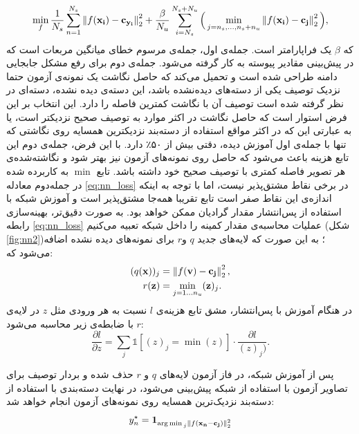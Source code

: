 \begin{equation}
\label{eq:nn_loss}
\min_{f}
\frac{1}{N_s} \sum_{n=1}^{N_s} \left \lVert f(\mathbf{x_i}) - \mathbf{c_{y_i}} \right \rVert_2^2 +
\frac{\beta}{N_u} \sum_{i=N_s}^{N_s+N_u} \Big ( \min_{j=n_s,\ldots,n_s + n_u} \left \lVert f(\mathbf{x_i) - c_j} \right \rVert_2^2 \Big ),
\end{equation}
که $\beta$ یک فراپارامتر است.
جمله‌ی اول، جمله‌ی مرسوم خطای میانگین مربعات است که در پیش‌بینی مقادیر پیوسته به کار گرفته می‌شود. جمله‌ی دوم برای رفع مشکل جابجایی دامنه طراحی شده است و تحمیل می‌کند که حاصل نگاشت یک نمونه‌ی آزمون حتما نزدیک توصیف یکی از دسته‌های دیده‌نشده باشد، این دسته‌ی دیده نشده، دسته‌ای در نظر گرفته شده است توصیف آن با نگاشت کمترین فاصله را دارد. این انتخاب بر این فرض استوار است که حاصل نگاشت در اکثر موارد به توصیف صحیح نزدیکتر است، یا به عبارتی این که در اکثر مواقع استفاده از دسته‌بند نزدیکترین همسایه روی نگاشتی که تنها با جمله‌ی اول آموزش دیده، دقتی بیش از ۵۰٪ دارد. با این فرض، جمله‌ی دوم این تابع هزینه باعث می‌شود که حاصل روی نمونه‌های آزمون نیز بهتر شود و نگاشته‌شده‌ی هر تصویر فاصله کمتری با توصیف صحیح خود داشته باشد. تابع $\min$ به کاربرده شده در جمله‌دوم معادله
\eqref{eq:nn_loss}
در برخی نقاط مشتق‌پذیر نیست، اما با توجه به اینکه اندازه‌ی این نقاط صفر است تابع تقریبا همه‌جا مشتق‌پذیر است و آموزش شبکه با استفاده از پس‌انتشار مقدار گرادیان ممکن خواهد بود. به صورت دقیق‌تر، بهینه‌سازی رابطه \eqref{eq:nn_loss} عملیات محاسبه‌ی مقدار کمینه را داخل شبکه تعبیه می‌کنیم (شکل \ref{fig:nn2})؛ به این صورت که لایه‌های جدید $q$ و$r$ برای نمونه‌های دیده نشده اضافه می‌شود که:
\begin{align}
\label{eq:min_layer}
(q(\mathbf{x}))_j &=  \left \lVert f(\mathbf{v) - c_j} \right \rVert_2^2, \\
r(\mathbf{z}) &= \min_{j=1\ldots n_u} (\mathbf{z})_j.
\end{align}
در هنگام آموزش با پس‌انتشار، مشق تابع هزینه‌ی $l$ نسبت به هر ورودی مثل $z$ در لایه‌ی $r$ با ضابطه‌ی زیر محاسبه می‌شود:
\begin{equation}
\label{eq:grad_min}
\frac{\partial l}{\partial z} = \sum_j \mathds{1}[(z)_j=\min(z)] \cdot \frac{\partial l}{(z)_j)}.
\end{equation}

پس از آموزش شبکه، در فاز آزمون لایه‌های $q$ و $r$ حذف شده و بردار توصیف برای تصاویر آزمون با استفاده از شبکه پیش‌بینی می‌شود، در نهایت دسته‌بندی با استفاده از دسته‌بند نزدیک‌ترین همسایه روی نمونه‌های آزمون انجام خواهد شد:
\begin{equation}
y^{\star}_n = \mathbf{1}_{\operatorname*{arg\,min\,}_{j} \left \lVert f(\mathbf{x_n - c_j}) \right \rVert_2^2}
\end{equation}
